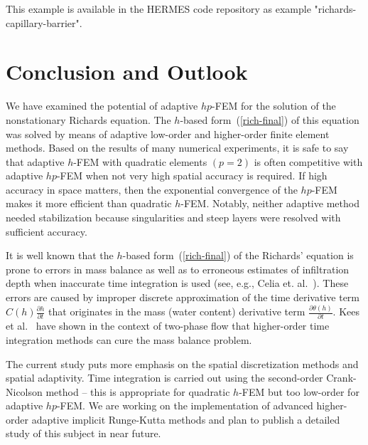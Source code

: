 \documentclass[final,3p,times,twocolumn]{elsarticle}
\begin{document}
This example is available in the HERMES code repository \cite{hermes-repo}
as example "richards-capillary-barrier".



\section{Conclusion and Outlook} \label{sec:8}

We have examined the potential of adaptive $hp$-FEM
for the solution of the nonstationary Richards equation. 
The $h$-based form~(\ref{rich-final}) of this equation 
was solved by means of adaptive low-order 
and higher-order finite element methods. 
Based on the results of many numerical experiments, 
it is safe to say that adaptive $h$-FEM with quadratic elements $(p=2)$
is often competitive with adaptive $hp$-FEM when not very high spatial 
accuracy is required. If high accuracy in space matters, then 
the exponential convergence of the $hp$-FEM makes it more 
efficient than quadratic $h$-FEM. Notably, neither adaptive
method needed stabilization because singularities and steep
layers were resolved with sufficient accuracy.



It is well known that the $h$-based form~(\ref{rich-final}) 
of the Richards' equation is prone 
to errors in mass balance as well as to erroneous estimates of 
infiltration depth when inaccurate time integration is used (see, e.g., 
Celia et. al.~\cite{celia}). These errors are caused by improper discrete 
approximation of the time derivative term 
$C(h)\frac{\partial h}{\partial t}$ that originates in the mass (water content) derivative 
term $\frac{\partial \theta(h)}{\partial t}$. Kees et al.~\cite{kees-time-integ} have 
shown in the context of two-phase flow that higher-order time integration methods
can cure the mass balance problem. 

The current study puts more emphasis on the spatial discretization methods 
and spatial adaptivity. Time integration is carried out using the 
second-order Crank-Nicolson method -- this is appropriate for quadratic $h$-FEM
but too low-order for adaptive $hp$-FEM. We are working on the implementation 
of advanced higher-order adaptive implicit Runge-Kutta methods and plan to 
publish a detailed study of this subject in near future.
\end{document}
